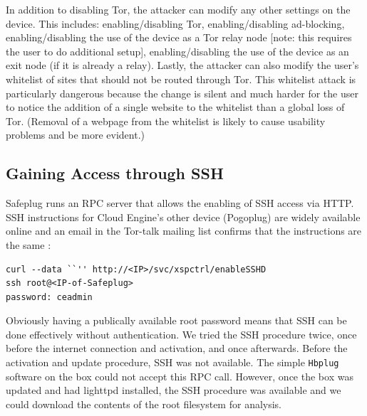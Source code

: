 \documentclass[conference]{IEEEtran}
\begin{document}
In addition to disabling Tor, the attacker can modify any other settings on the device.  This includes: enabling/disabling Tor, enabling/disabling ad-blocking, enabling/disabling the use of the device as a Tor relay node [note: this requires the user to do additional setup], enabling/disabling the use of the device as an exit node (if it is already a relay).  Lastly, the attacker can also modify the user's whitelist of sites that should not be routed through Tor.  This whitelist attack is particularly dangerous because the change is silent and much harder for the user to notice the addition of a single website to the whitelist than a global loss of Tor.  (Removal of a webpage from the whitelist is likely to cause usability problems and be more evident.)

\subsection{Gaining Access through SSH}
\label{sec:SSH}
    Safeplug runs an RPC server that allows the enabling of SSH access via HTTP. SSH instructions for Cloud Engine's other device (Pogoplug) are widely available online and an email in the Tor-talk mailing list confirms that the instructions are the same \cite{ceadmin}:
\begin{lstlisting}
curl --data ``'' http://<IP>/svc/xspctrl/enableSSHD
ssh root@<IP-of-Safeplug>
password: ceadmin
\end{lstlisting}

Obviously having a publically available root password means that SSH can be done effectively without authentication.  We tried the SSH procedure twice, once before the internet connection and activation, and once afterwards.  Before the activation and update procedure, SSH was not available.  The simple \verb!Hbplug! software on the box could not accept this RPC call.  However, once the box was updated and had lighttpd installed, the SSH procedure was available and we could download the contents of the root filesystem for analysis.
\end{document}
